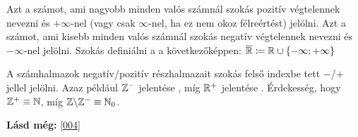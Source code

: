 \begin{note4}
Azt a számot, ami nagyobb minden valós számnál szokás pozitív végtelennek
nevezni és $+\infty$-nel (vagy csak $\infty$-nel, ha ez nem okoz félreértést)
jelölni. Azt a számot, ami kisebb minden valós számnál szokás negatív
végtelennek nevezni és $-\infty$-nel jelölni. Szokás definiálni a
 a következőképpen:
$\overline{\mathbb{R}} \coloneqq \mathbb{R} \cup \{-\infty; +\infty\}$
\end{note4}

\begin{note2}
A számhalmazok negatív/pozitív részhalmazait szokás felső indexbe tett $-$/$+$
jellel jelölni. Azaz például $\mathbb{Z}^-$ jelentése , míg $\mathbb{R}^+$ jelentése . Érdekesség, hogy $\mathbb{Z}^+ \equiv \mathbb{N}$,
míg $\mathbb{Z} \backslash \mathbb{Z}^- \equiv \mathbb{N}_0$.
\end{note2}

\textbf{Lásd még:} \ref{004}
